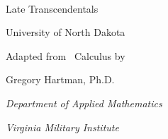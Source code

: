 


\begin{flushright}

\textsc{\large \apex\ {\Huge\thetitle}} \\

Late Transcendentals



\Large

University of North Dakota\bigskip

\normalsize

Adapted from \apex\ Calculus by

Gregory Hartman, Ph.D.

\emph{\small Department of Applied Mathematics}

\emph{\small Virginia Military Institute}

\end{flushright}
\normalsize
{}
\restoregeometry

